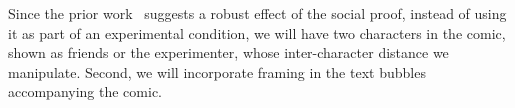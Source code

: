

Since the prior work~\cite{goldstein2008room,schultz2007constructive} suggests a robust effect of the social proof, instead of using it as part of an experimental condition, we will have two characters in the comic, shown as friends or the experimenter, whose inter-character distance we manipulate. Second, we will incorporate framing in the text bubbles accompanying the comic.
